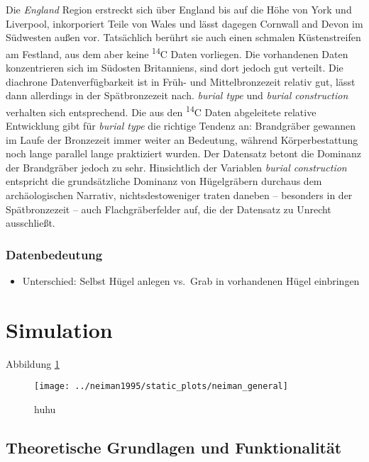 \documentclass[openany,twoside,twocolumn]{book}
\providecommand{\tightlist}{%
  \setlength{\itemsep}{0pt}\setlength{\parskip}{0pt}}
\begin{document}
Die \emph{England} Region erstreckt sich über England bis auf die Höhe
von York und Liverpool, inkorporiert Teile von Wales und lässt dagegen
Cornwall and Devon im Südwesten außen vor. Tatsächlich berührt sie auch
einen schmalen Küstenstreifen am Festland, aus dem aber keine
\textsuperscript{14}C Daten vorliegen. Die vorhandenen Daten
konzentrieren sich im Südosten Britanniens, sind dort jedoch gut
verteilt. Die diachrone Datenverfügbarkeit ist in Früh- und
Mittelbronzezeit relativ gut, lässt dann allerdings in der
Spätbronzezeit nach. \emph{burial type} und \emph{burial construction}
verhalten sich entsprechend. Die aus den \textsuperscript{14}C Daten
abgeleitete relative Entwicklung gibt für \emph{burial type} die
richtige Tendenz an: Brandgräber gewannen im Laufe der Bronzezeit immer
weiter an Bedeutung, während Körperbestattung noch lange parallel lange
praktiziert wurden. Der Datensatz betont die Dominanz der Brandgräber
jedoch zu sehr. Hinsichtlich der Variablen \emph{burial construction}
entspricht die grundsätzliche Dominanz von Hügelgräbern durchaus dem
archäologischen Narrativ, nichtsdestoweniger traten daneben -- besonders
in der Spätbronzezeit -- auch Flachgräberfelder auf, die der Datensatz
zu Unrecht ausschließt.

\hypertarget{datenbedeutung}{%
\subsubsection{Datenbedeutung}\label{datenbedeutung}}

\begin{itemize}
\tightlist
\item
  Unterschied: Selbst Hügel anlegen vs.~Grab in vorhandenen Hügel
  einbringen
\end{itemize}

\hypertarget{simulation}{%
\section{Simulation}\label{simulation}}

Abbildung \ref{fig:neiman-general}

\begin{figure}
\texttt{[image: ../neiman1995/static\_plots/neiman\_general]} \caption[huhu]{huhu}\label{fig:neiman-general}
\end{figure}

\hypertarget{simulation-theorie}{%
\subsection{Theoretische Grundlagen und
Funktionalität}\label{simulation-theorie}}
\end{document}
